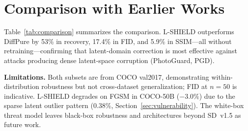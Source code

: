 \documentclass[conference]{IEEEtran}
\begin{document}
\section{Comparison with Earlier Works}

Table~\ref{tab:comparison} summarizes the comparison.
L-SHIELD outperforms DiffPure by 53\% in recovery, 17.4\% in FID, and 5.9\%
in SSIM---all without retraining---confirming that latent-domain correction
is most effective against attacks producing dense latent-space corruption (PhotoGuard, PGD).

\begin{table}[t]
\caption{Comparison with Prior Defenses on COCO-50 (averages across all four
attacks). Input Transform and Adversarial Training not evaluated on SD img2img.}
\label{tab:comparison}
\centering
\renewcommand{\arraystretch}{1.08}
\end{table}


\textbf{Limitations.}
Both subsets are from COCO val2017, demonstrating within-distribution robustness
but not cross-dataset generalization; FID at $n{=}50$ is indicative.
L-SHIELD degrades on FGSM in COCO-50B ($-3.0\%$) due to the sparse latent
outlier pattern (0.38\%, Section~\ref{sec:vulnerability}). The white-box threat model leaves
black-box robustness and architectures beyond SD~v1.5 as future work.
\end{document}
